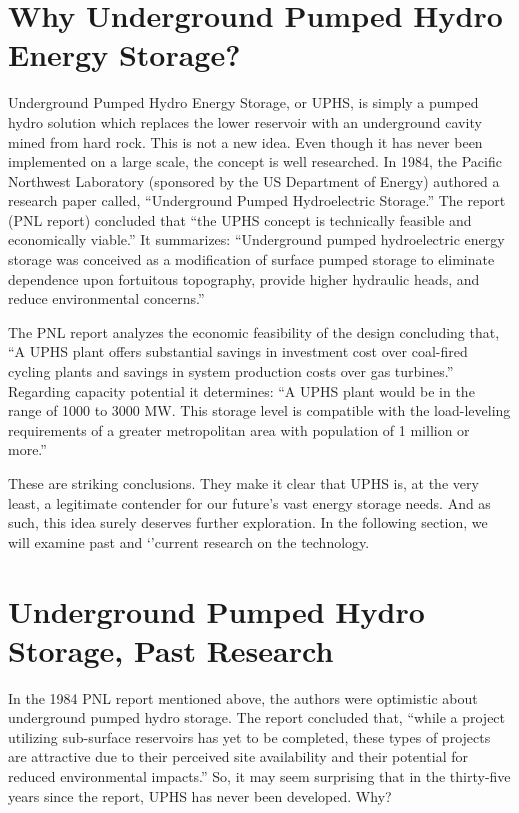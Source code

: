 \documentclass[hidelinks,12pt,a4paper]{article}
\begin{document}
\pagebreak[4]
\section{Why Underground Pumped Hydro Energy Storage?}
Underground Pumped Hydro Energy Storage, or UPHS, is simply a pumped hydro solution which replaces the lower reservoir with an underground cavity mined from hard rock. This is not a new idea. Even though it has never been implemented on a large scale, the concept is well researched. In 1984, the Pacific Northwest Laboratory (sponsored by the US Department of Energy) authored a research paper called, “Underground Pumped Hydroelectric Storage.” The report (PNL report) concluded that “the UPHS concept is technically feasible and economically viable.” \cite{UndergroundPumpedHydroelectricStorage} It summarizes: “Underground pumped hydroelectric energy storage was conceived as a modification of surface pumped storage to eliminate dependence upon fortuitous topography, provide higher hydraulic heads, and reduce environmental concerns.” \cite{UndergroundPumpedHydroelectricStorage}

The PNL report analyzes the economic feasibility of the design concluding that, “A UPHS plant offers substantial savings in investment cost over coal-fired cycling plants and savings in system production costs over gas turbines.” \cite{UndergroundPumpedHydroelectricStorage} Regarding capacity potential it determines: “A UPHS plant would be in the range of 1000 to 3000 MW. This storage level is compatible with the load-leveling requirements of a greater metropolitan area with population of 1 million or more.” \cite{SubSurfacePumpedHydroelectricStorage}

These are striking conclusions. They make it clear that UPHS is, at the very least, a legitimate contender for our future's vast energy storage needs. And as such, this idea surely deserves further exploration. In the following section, we will examine past and `'current research on the technology.

\pagebreak[4]
\section{Underground Pumped Hydro Storage, Past Research}
In the 1984 PNL report mentioned above, the authors were optimistic about underground pumped hydro storage. The report concluded that, “while a project utilizing sub-surface reservoirs has yet to be completed, these types of projects are attractive due to their perceived site availability and their potential for reduced environmental impacts.” \cite{SubSurfacePumpedHydroelectricStorage} So, it may seem surprising that in the thirty-five years since the report, UPHS has never been developed. Why?
\end{document}

